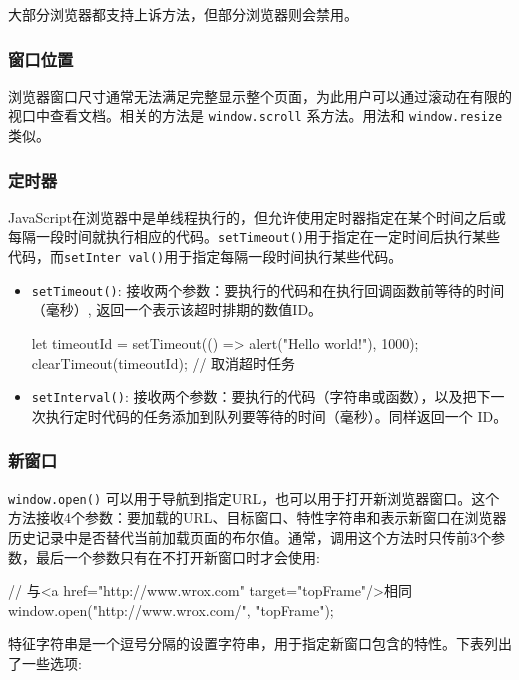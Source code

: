 大部分浏览器都支持上诉方法，但部分浏览器则会禁用。

\subsubsection*{窗口位置}

浏览器窗口尺寸通常无法满足完整显示整个页面，为此用户可以通过滚动在有限的视口中查看文档。相关的方法是 \texttt{window.scroll} 系方法。用法和 \texttt{window.resize} 类似。

\subsubsection*{定时器}

JavaScript在浏览器中是单线程执行的，但允许使用定时器指定在某个时间之后或每隔一段时间就执行相应的代码。\texttt{setTimeout()}用于指定在一定时间后执行某些代码，而\texttt{setInter val()}用于指定每隔一段时间执行某些代码。

\begin{itemize}
    \item \texttt{setTimeout()}: 接收两个参数：要执行的代码和在执行回调函数前等待的时间（毫秒）, 返回一个表示该超时排期的数值ID。
\begin{JavaScript}
let timeoutId = setTimeout(() => alert("Hello world!"), 1000); 
clearTimeout(timeoutId);    // 取消超时任务
\end{JavaScript}
    \item \texttt{setInterval()}: 接收两个参数：要执行的代码（字符串或函数），以及把下一次执行定时代码的任务添加到队列要等待的时间（毫秒）。同样返回一个 ID。
\end{itemize}

\subsubsection{新窗口}

\texttt{window.open()} 可以用于导航到指定URL，也可以用于打开新浏览器窗口。这个方法接收4个参数：要加载的URL、目标窗口、特性字符串和表示新窗口在浏览器历史记录中是否替代当前加载页面的布尔值。通常，调用这个方法时只传前3个参数，最后一个参数只有在不打开新窗口时才会使用:

\begin{JavaScript}
// 与<a href="http://www.wrox.com" target="topFrame"/>相同
window.open("http://www.wrox.com/", "topFrame"); 
\end{JavaScript}

特征字符串是一个逗号分隔的设置字符串，用于指定新窗口包含的特性。下表列出了一些选项:

